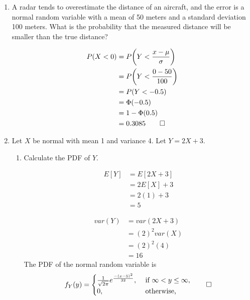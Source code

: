 \documentclass[paper=usletter, fontsize=12pt]{article}
\begin{document}

    \begin{enumerate}

        \item A radar tends to overestimate the distance of an aircraft, and
        the error is a normal random variable with a mean of 50 meters and a
        standard deviation 100 meters. What is the probability that the
        measured distance will be smaller than the true distance?
        \begin{cproof}

            \begin{align*}
                P(X<0) & = P\bigg(Y<\frac{x-\mu}{\sigma} \bigg)\\
                & = P\bigg(Y<\frac{0-50}{100} \bigg)\\
                & = P(Y<-0.5)\\
                & = \Phi(-0.5)\\
                & = 1-\Phi(0.5)\\
                & = 0.3085 \qedhere
            \end{align*}
            \endgroup

        \end{cproof}

        \item Let $X$ be normal with mean 1 and variance 4. Let $Y=2X+3$.
        \begin{enumerate}

            \item Calculate the PDF of $Y$.
            \begin{cproof}

                \begin{align*}
                    E[Y] & = E[2X+3] \\
                    & = 2E[X]+3\\
                    & = 2(1)+3\\
                    & = 5
                \end{align*}

                \begin{align*}
                    var(Y) & = var(2X+3) \\
                    & = (2)^2var(X) \\
                    & = (2)^2(4)\\
                    & = 16
                \end{align*}
                The PDF of the normal random variable is
                \begin{equation*}
                    f_{Y}(y) = \begin{cases}
                        \frac{1}{\sqrt{2\pi}}e^{\frac{-(x-5)^2}{32}}, & \text{ if } \infty < y \le \infty,\\
                        0, & \text{ otherwise, }
                    \end{cases} \qedhere
                \end{equation*}
                \endgroup


\end{cproof}
\end{enumerate}
\end{enumerate}
\end{document}
